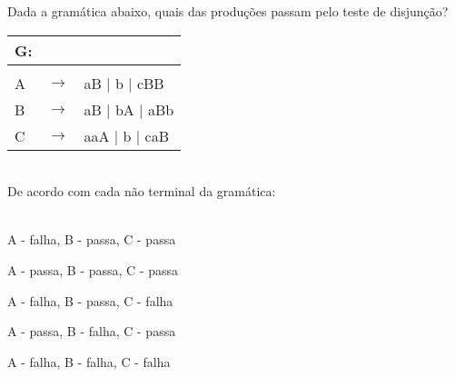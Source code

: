 \question[10] 

Dada a gramática abaixo, quais das produções passam pelo teste de disjunção?\\
\begin{tabular}{|l c l}
	G: & & \\
	\hline \\
	A & $\rightarrow$ & aB | b | cBB \\
    B & $\rightarrow$ & aB | bA | aBb \\
	C & $\rightarrow$ & aaA | b | caB \\
\end{tabular}
\\
De acordo com cada não terminal da gramática:\\
\\
\begin{choices}
\item A - falha, B - passa, C - passa
\item A - passa, B - passa, C - passa
\item A - falha, B - passa, C - falha
\item A - passa, B - falha, C - passa %
\item A - falha, B - falha, C - falha
\end{choices}
\answerline


